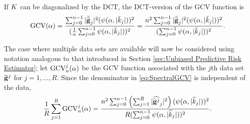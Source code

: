 If $K$ can be diagonalized by the DCT, the DCT-version of the GCV function is
\begin{equation}
\text{GCV}(\alpha) = \frac{\sum_{j = 0}^{n-1} |\breve{\widetilde{\mathbf{g}}}_j|^2(\psi(\alpha,|\breve{k}_j|))^2}{(\frac{1}{n}\sum_{j = 0}^{n-1} \psi(\alpha,|\breve{k}_j|))^2} = \frac{n^2\sum_{j = 0}^{n-1} |\breve{\widetilde{\mathbf{g}}}_j|^2(\psi(\alpha,|\breve{k}_j|))^2}{(\sum_{j = 0}^{n-1} \psi(\alpha,|\breve{k}_j|))^2}.
\label{eq:GCV DCT}
\end{equation}

The case where multiple data sets are available will now be considered using notation analogous to that introduced in Section \ref{sec:Unbiased Predictive Risk Estimator}; let $\text{GCV}_n^j(\alpha)$ be the GCV function associated with the $j$th data set $\widetilde{\mathbf{g}}^j$ for $j = 1,\ldots,R$. Since the denominator in \eqref{eq:SpectralGCV} is independent of the data,
\begin{equation}
\frac{1}{R}\sum_{j=1}^R \text{GCV}_n^j(\alpha)  = \frac{n^2\sum_{j = 0}^{n-1} \left(\sum_{j=1}^R |\widehat{\widetilde{\mathbf{g}}^j}_j|^2\right)(\psi(\alpha,|\widehat{k}_j|))^2}{R(\sum_{j = 0}^{n-1} \psi(\alpha,|\widehat{k}_j|))^2}.
\label{eq:SpectralGCVsum}
\end{equation}

